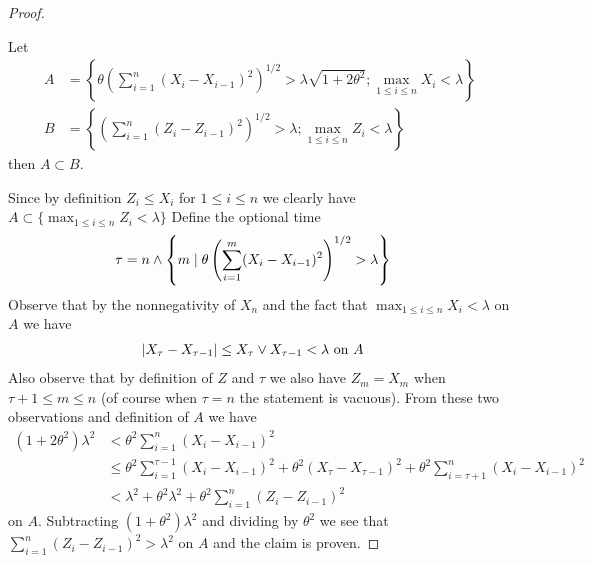 \begin{proof}
\begin{clm} Let 
\begin{align*}
A &= \left \lbrace \theta \left( \sum_{i=1}^n (X_i-X_{i-1})^2 \right)^{1/2} > \lambda \sqrt{1+2\theta^2}; \max_{1 \leq i \leq  n} X_i < \lambda \right \rbrace \\
B &= \left \lbrace \left( \sum_{i=1}^n (Z_i - Z_{i-1})^2 \right)^{1/2} > \lambda ; \max_{1 \leq i \leq n} Z_i < \lambda \right \rbrace
\end{align*}
then $A \subset B$.
\end{clm}
Since by definition $Z_i \leq X_i$ for $1 \leq i \leq n$ we clearly have $A \subset \lbrace \max_{1 \leq i \leq n} Z_i < \lambda \rbrace$
Define the optional time 
\begin{align*}
\tau &= n \wedge \left \lbrace m \mid \theta \left( \sum_{i=1}^m (X_i-X_{i-1})^2 \right)^{1/2} > \lambda \right \rbrace
\end{align*}
Observe that by the nonnegativity of $X_n$ and the fact that $\max_{1 \leq i \leq  n} X_i < \lambda$ on $A$ we have
\begin{align*}
\left \vert X_\tau - X_{\tau-1} \right \vert &\leq X_\tau \vee X_{\tau-1} < \lambda \text{ on $A$}
\end{align*}  
Also observe that by definition of $Z$ and $\tau$ we also have $Z_m = X_m$ when $\tau+1 \leq m \leq n$ (of course when $\tau=n$ the statement is vacuous).
From these two observations and definition of $A$ we have
\begin{align*}
(1+2\theta^2) \lambda^2 &< \theta^2 \sum_{i=1}^n (X_i-X_{i-1})^2 \\
&\leq \theta^2 \sum_{i=1}^{\tau-1} (X_i-X_{i-1})^2 + \theta^2 (X_\tau - X_{\tau-1})^2 + \theta^2 \sum_{i=\tau+ 1}^n (X_i-X_{i-1})^2 \\
&<  \lambda^2 + \theta^2 \lambda^2 + \theta^2 \sum_{i=1}^n (Z_i-Z_{i-1})^2
\end{align*}
on $A$.  Subtracting $(1+\theta^2)\lambda^2$ and dividing by $\theta^2$ we see that $\sum_{i=1}^n (Z_i-Z_{i-1})^2 > \lambda^2$ on $A$ and the claim is proven.


\end{proof}
